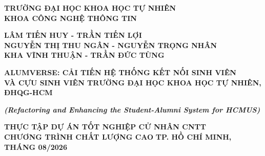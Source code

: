 \documentclass[12pt,a4paper,oneside]{report}
\begin{document}
\begin{titlepage}
\begin{center}
{\fontsize{12}{18}\selectfont \textbf{TRƯỜNG ĐẠI HỌC KHOA HỌC TỰ NHIÊN}}\\[2pt]
{\fontsize{12}{18}\selectfont \textbf{KHOA CÔNG NGHỆ THÔNG TIN}}

\par\vspace{3cm}
{\fontsize{12}{18}\selectfont \textbf{LÂM TIẾN HUY - TRẦN TIẾN LỢI}}\\[3pt]
{\fontsize{12}{18}\selectfont \textbf{NGUYỄN THỊ THU NGÂN - NGUYỄN TRỌNG NHÂN}}\\[3pt]
{\fontsize{12}{18}\selectfont \textbf{KHA VĨNH THUẬN - TRẦN ĐỨC TÙNG}}

\par\vspace{3cm}
{\fontsize{15}{21.5}\selectfont\bfseries ALUMVERSE: CẢI TIẾN HỆ THỐNG KẾT NỐI SINH VIÊN\\[6pt]
VÀ CỰU SINH VIÊN TRƯỜNG ĐẠI HỌC KHOA HỌC TỰ NHIÊN, ĐHQG-HCM}

\par\vspace{0.4cm}
{\fontsize{12}{16}\selectfont\bfseries\itshape (Refactoring and Enhancing the Student-Alumni System for HCMUS)}

\par\vspace{3cm}
{\fontsize{12}{18}\selectfont\bfseries THỰC TẬP DỰ ÁN TỐT NGHIỆP CỬ NHÂN CNTT}\\[6pt]
{\fontsize{12}{18}\selectfont\bfseries CHƯƠNG TRÌNH CHẤT LƯỢNG CAO}
\vfill
{\fontsize{12}{18}\selectfont\bfseries TP. HỒ CHÍ MINH, THÁNG 08/2026}
\end{center}
\end{titlepage}
\end{document}

